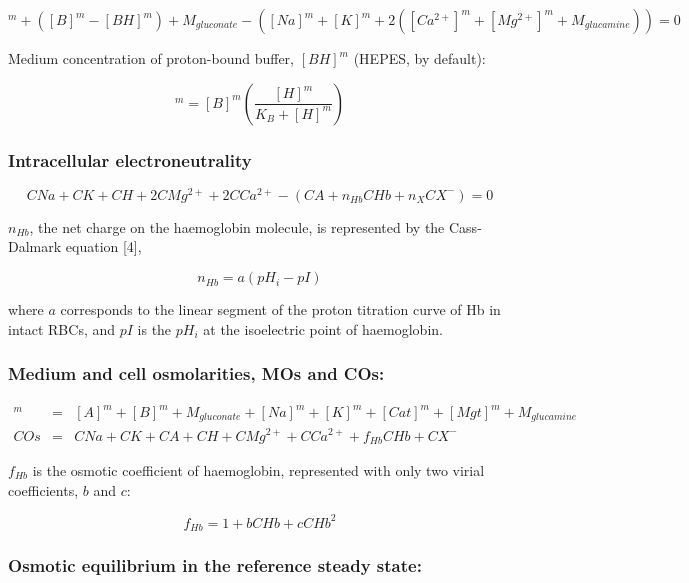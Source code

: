 \documentclass[a4paper]{article}
\newcommand{\med}[1]{[#1]^m}
\newcommand{\cell}[1]{C#1}
\newcommand{\MA}{\med{A}}
\newcommand{\MB}{\med{B}}
\newcommand{\MBH}{\med{BH}}
\newcommand{\MGluca}{M_{glucamine}}
\newcommand{\MNa}{\med{Na}}
\newcommand{\MK}{\med{K}}
\newcommand{\MCatp}{\med{Ca^{2+}}}
\newcommand{\MMgtp}{\med{Mg^{2+}}}
\newcommand{\MGluco}{M_{gluconate}}
\newcommand{\MH}{\med{H}}
\newcommand{\MOs}{\med{Os}}
\newcommand{\MCat}{\med{Cat}}
\newcommand{\MMgt}{\med{Mgt}}
\newcommand{\KB}{K_B}
\newcommand{\CNa}{\cell{Na}}
\newcommand{\CK}{\cell{K}}
\newcommand{\CH}{\cell{H}}
\newcommand{\CMgtp}{\cell{Mg^{2+}}}
\newcommand{\CCatp}{\cell{Ca^{2+}}}
\newcommand{\CA}{\cell{A}}
\newcommand{\nHb}{n_{Hb}}
\newcommand{\CHb}{\cell{Hb}}
\newcommand{\nX}{n_{X}}
\newcommand{\CXm}{\cell{X^{-}}}
\newcommand{\COs}{\cell{Os}}
\newcommand{\pH}[1]{pH_{#1}}
\newcommand{\pI}{pI}
\newcommand{\fHb}{f_{Hb}}
\begin{document}
\begin{equation}
\MA + (\MB - \MBH) + \MGluco-(\MNa + \MK + 2(\MCatp + \MMgtp + \MGluca)) = 0
\end{equation}

Medium concentration of proton-bound buffer, $\MBH$ (HEPES, by default):

\begin{equation}
\MBH = \MB\left(\frac{\MH}{\KB + \MH}\right)
\end{equation}

\subsubsection{Intracellular electroneutrality}

\begin{equation}
\CNa + \CK + \CH + 2\CMgtp + 2\CCatp - (\CA + \nHb\CHb + \nX\CXm) = 0
\end{equation}

$\nHb$, the net charge on the haemoglobin molecule, is represented by the Cass-Dalmark equation [4],

\begin{equation}
\nHb=  a(\pH{i} - \pI)
\end{equation}

where $a$ corresponds to the linear segment of the proton titration curve of Hb in intact RBCs, and $\pI$ is the $\pH{i}$ at the isoelectric point of haemoglobin.

\subsubsection{Medium and cell osmolarities, MOs and COs:}

\begin{eqnarray}
	\MOs &=& \MA + \MB + \MGluco + \MNa + \MK + \MCat + \MMgt + \MGluca\\
	\COs &=& \CNa + \CK + \CA + \CH + \CMgtp + \CCatp  + \fHb\CHb + \CXm
\end{eqnarray}

$\fHb$ is the osmotic coefficient of haemoglobin, represented with only two virial coefficients, $b$ and $c$:

\begin{equation}
\fHb = 1 + b\CHb + c\CHb^2 
\end{equation}

\subsubsection{Osmotic equilibrium in the reference steady state:}
\end{document}
